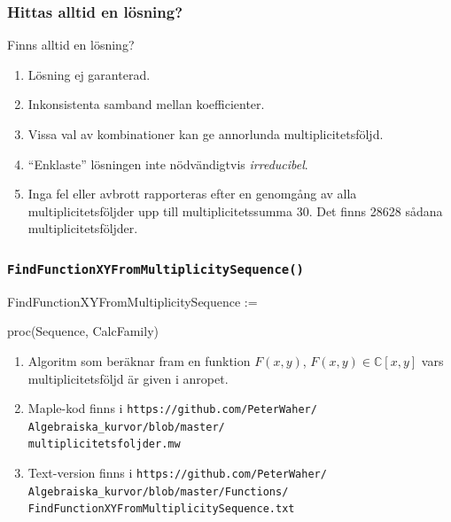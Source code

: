 \documentclass{beamer}
\begin{document}
\begin{frame}
	\frametitle{Hittas alltid en lösning?}
	
	Finns alltid en lösning?
	
	\begin{enumerate}
		\item<2-> Lösning ej garanterad.
		
		\item<3-> Inkonsistenta samband mellan koefficienter.
		
		\item<4-> Vissa val av kombinationer kan ge annorlunda multiplicitetsföljd.
		
		\item<5-> ``Enklaste'' lösningen inte nödvändigtvis \emph{irreducibel}.
		
		\item<6-> Inga fel eller avbrott rapporteras efter en genomgång av alla multiplicitetsföljder upp till multiplicitetssumma 30. Det finns 28628 sådana multiplicitetsföljder.
	\end{enumerate}
\end{frame}

\begin{frame}
	\frametitle{\texttt{FindFunctionXYFromMultiplicitySequence()}}
	
	\begin{semiverbatim}
		FindFunctionXYFromMultiplicitySequence := 

\qquad proc(Sequence, CalcFamily)
	\end{semiverbatim}
	
	\begin{enumerate}
		\item<1-> Algoritm som beräknar fram en funktion $F(x,y)$, $F(x, y) \in \mathbb{C}\left[x, y\right]$ vars multiplicitetsföljd är given i anropet.
		
		\item<2-> Maple-kod finns i \texttt{https://github.com/PeterWaher/\\
			\qquad Algebraiska\_kurvor/blob/master/\\
			\qquad multiplicitetsfoljder.mw}
		
		\item<3-> Text-version finns i
		\texttt{https://github.com/PeterWaher/\\
			\qquad Algebraiska\_kurvor/blob/master/Functions/\\
			\qquad FindFunctionXYFromMultiplicitySequence.txt} 
	\end{enumerate}
\end{frame}
\end{document}
